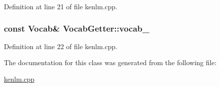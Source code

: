 Definition at line 21 of file kenlm.\+cpp.

\subsubsection[{\texorpdfstring{vocab\+\_\+}{vocab_}}]{\setlength{\rightskip}{0pt plus 5cm}const Vocab\& Vocab\+Getter\+::vocab\+\_\+\hspace{0.3cm}{\ttfamily [private]}}\hypertarget{classVocabGetter_ae296f6ed2ee0ae8a6ddc8f5d079e4d0b}{}\label{classVocabGetter_ae296f6ed2ee0ae8a6ddc8f5d079e4d0b}


Definition at line 22 of file kenlm.\+cpp.



The documentation for this class was generated from the following file\+:\begin{DoxyCompactItemize}
\item 
\hyperlink{kenlm_8cpp}{kenlm.\+cpp}\end{DoxyCompactItemize}

